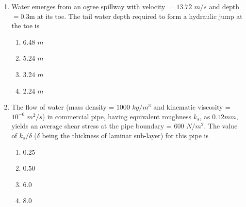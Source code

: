 \documentclass[journal]{IEEEtran}
\begin{document}
\begin{enumerate}
	\item Water emerges from an ogree spillway with velocity $= 13.72$ $m/s$ and depth $= 0.3$m at its toe. The tail water depth required to form a hydraulic jump at the toe is
\begin{multicols}{2}
	\begin{enumerate}
		\item 6.48 $m$
		\item 5.24 $m$
		\item 3.24 $m$
		\item 2.24 $m$
	\end{enumerate}
\end{multicols}
	\item The flow of water (mass density = $1000$ $kg/m^3$ and kinematic viscosity = $10^{-6}$ $m^2/s$) in commercial pipe, having equivalent roughness $k_s$, as $0.12mm$, yields an average shear stress at the pipe boundary = $600$ $N/m^2$. The value of $k_s / \delta$ ($\delta$ being the thickness of laminar sub-layer) for this pipe is
		\begin{multicols}{2}
	\begin{enumerate}
		\item 0.25
		\item 0.50
		\item 6.0
		\item 8.0
	\end{enumerate}
\end{multicols}


\end{enumerate}
\end{document}
